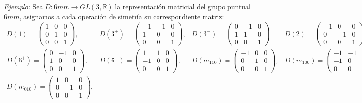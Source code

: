 \documentclass{report}
\begin{document}
\textit{Ejemplo:}
Sea \( D: 6mm \to GL(3, \mathbb{R}) \) la representación matricial del grupo puntual \( 6mm \), asignamos a cada operación de simetría su correspondiente matriz:\\
\vspace{.4cm}
\small{
\[
\begin{array}{cccc}
D(1) = 
\begin{pmatrix} 
1 & 0 & 0 \\ 
0 & 1 & 0 \\ 
0 & 0 & 1 
\end{pmatrix},
&
D(3^+) = 
\begin{pmatrix} 
-1 & -1 & 0 \\ 
1 & 0 & 0 \\ 
0 & 0 & 1 
\end{pmatrix},
&
D(3^-) = 
\begin{pmatrix} 
0 & -1 & 0 \\ 
1 & 1 & 0 \\ 
0 & 0 & 1 
\end{pmatrix},
&
D(2) = 
\begin{pmatrix} 
-1 & 0 & 0 \\ 
0 & -1 & 0 \\ 
0 & 0 & 1 
\end{pmatrix},
\\[20pt]
D(6^+) = 
\begin{pmatrix} 
0 & -1 & 0 \\ 
1 & 0 & 0 \\ 
0 & 0 & 1 
\end{pmatrix},
&
D(6^-) = 
\begin{pmatrix} 
1 & 1 & 0 \\ 
-1 & 0 & 0 \\ 
0 & 0 & 1 
\end{pmatrix},
&
D(m_{110}) = 
\begin{pmatrix} 
-1 & 0 & 0 \\ 
0 & 1 & 0 \\ 
0 & 0 & 1 
\end{pmatrix},
&
D(m_{100}) = 
\begin{pmatrix} 
-1 & -1 & 0 \\ 
-1 & 0 & 0 \\ 
0 & 0 & 1 
\end{pmatrix},
\\[20pt]
D(m_{010}) = 
\begin{pmatrix} 
1 & 0 & 0 \\ 
0 & -1 & 0 \\ 
0 & 0 & 1 
\end{pmatrix},

\end{array}\]}
\end{document}
